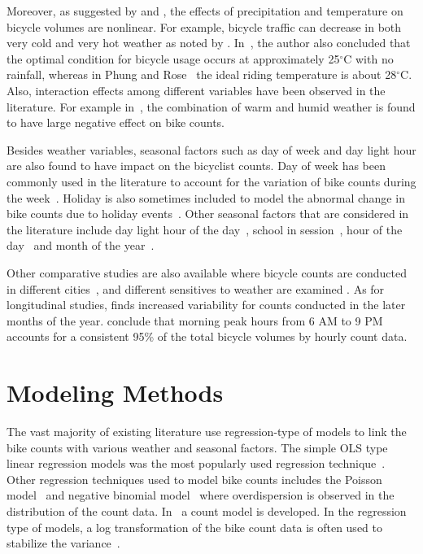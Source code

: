 \documentclass [11pt, proquest] {uwthesis}[2015/03/03]
\begin{document}
Moreover, as suggested by \cite{Lewin:2011aa} and \cite{Thomas:2009aa}, the effects of precipitation and temperature on bicycle volumes are nonlinear. For example, bicycle traffic can decrease in both very cold and very hot weather as noted by \cite{Richardson:2000aa}. In~\cite{Richardson:2000aa}, the author also concluded that the optimal condition for bicycle usage occurs at approximately 25$^\circ$C with no rainfall, whereas in Phung and Rose~\cite{Rose07} the ideal riding temperature is about 28$^\circ$C. Also, interaction effects among different variables have been observed in the literature. For example in~\cite{Miranda-Moreno:2011aa}, the combination of warm and humid weather is found to have large negative effect on bike counts.

Besides weather variables, seasonal factors such as day of week and day light hour are also found to have impact on the bicyclist counts. Day of week has been commonly used in the literature to account for the variation of bike counts during the week~\cite{Ahmed12,PeterWeiran16,Miranda-Moreno:2011aa}. Holiday is also sometimes included to model the abnormal change in bike counts due to holiday events~\cite{Rose07}. Other seasonal factors that are considered in the literature include day light hour of the day~\cite{Ahmed12}, school in session~\cite{PeterWeiran16}, hour of the day~\cite{Miranda-Moreno:2011aa} and month of the year~\cite{Tin:2012aa}.

Other comparative studies are also available where bicycle counts are conducted in different cities~\cite{Nosal:2014aa}, and different sensitives to weather are examined \cite{Rose:2011aa}. As for longitudinal studies, \cite{Niemeier:1996aa} finds increased variability for counts conducted in the later months of the year. \cite{Jones:2010aa} conclude that morning peak hours from 6 AM to 9 PM accounts for a consistent 95\% of the total bicycle volumes by hourly count data. 

\section{Modeling Methods}

The vast majority of existing literature use regression-type of models to link the bike counts with various weather and seasonal factors. The simple OLS type linear regression models was the most popularly used regression technique~\cite{Jones:2008aa,Jones:2010aa}. Other regression techniques used to model bike counts includes the Poisson model~\cite{Niemeier:1996aa} and negative binomial model~\cite{PeterWeiran16} where overdispersion is observed in the distribution of the count data.  In~\cite{Miranda-Moreno:2011aa} a count model is developed. In the regression type of models, a log transformation of the bike count data is often used to stabilize the variance~\cite{}.
\end{document}
